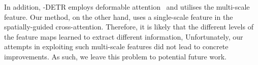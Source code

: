 \documentclass[10pt,twocolumn,letterpaper]{article}
\begin{document}
In addition, -DETR employs deformable attention~\cite{deform-detr} and utilises the multi-scale feature.
Our method, on the other hand, uses a single-scale feature in the spatially-guided cross-attention.
Therefore, it is likely that the different levels of the feature maps learned to extract different information,
Unfortunately, our attempts in exploiting such multi-scale features did not lead to concrete improvements.
As such, we leave this problem to potential future work.
\end{document}
